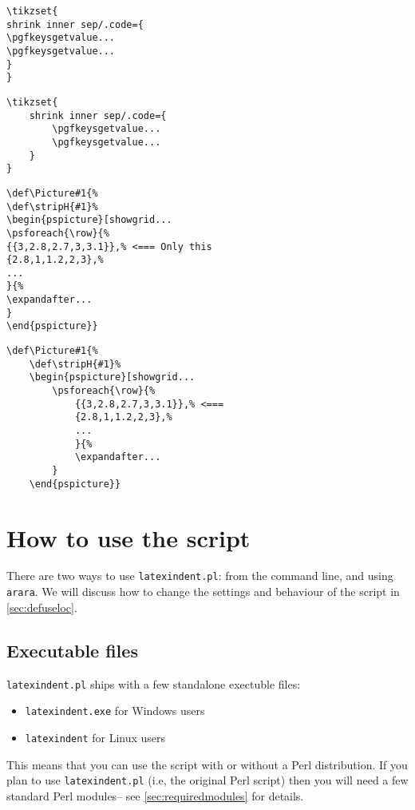 \begin{adjustwidth}{-2cm}{2cm}
	\begin{minipage}{.5\textwidth}
		\begin{lstlisting}[style=demo,caption={\lstinline!tikzset! before}]
\tikzset{
shrink inner sep/.code={
\pgfkeysgetvalue...
\pgfkeysgetvalue...
}
}
		\end{lstlisting}
	\end{minipage}%
	\begin{minipage}{.5\textwidth}
		\begin{lstlisting}[style=demo,caption={\lstinline!tikzset! after}]
\tikzset{
	shrink inner sep/.code={
		\pgfkeysgetvalue...
		\pgfkeysgetvalue...
	}
}
		\end{lstlisting}
	\end{minipage}
	\begin{minipage}{.5\textwidth}
		\begin{lstlisting}[style=demo,caption={\lstinline!pstricks! before}]
\def\Picture#1{%
\def\stripH{#1}%
\begin{pspicture}[showgrid...
\psforeach{\row}{%
{{3,2.8,2.7,3,3.1}},% <=== Only this 
{2.8,1,1.2,2,3},%
...
}{%
\expandafter...
}
\end{pspicture}}
		\end{lstlisting}
	\end{minipage}%
	\begin{minipage}{.5\textwidth}
		\begin{lstlisting}[style=demo,caption={\lstinline!pstricks! after},label={lst:pstricksafter}]
\def\Picture#1{%
	\def\stripH{#1}%
	\begin{pspicture}[showgrid...
		\psforeach{\row}{%
			{{3,2.8,2.7,3,3.1}},% <=== 
			{2.8,1,1.2,2,3},%
            ...
			}{%
			\expandafter...
		}
	\end{pspicture}}
		\end{lstlisting}
	\end{minipage}
\end{adjustwidth}
     
\section{How to use the script}
There are two ways to use \lstinline!latexindent.pl!: from the command line, 
and using \lstinline!arara!.  We will discuss how to change the settings and behaviour 
of the script in \cref{sec:defuseloc}.

\subsection{Executable files}
\lstinline!latexindent.pl! ships with a few standalone exectuble files:
\begin{itemize}
	\item \lstinline!latexindent.exe! for Windows users
	\item \lstinline!latexindent! for Linux users
\end{itemize}
This means that you can use the script with or without a Perl distribution. If you 
plan to use \lstinline!latexindent.pl! (i.e, the original Perl script) then you will 
need a few standard Perl modules-- see \vref{sec:requiredmodules} for details.

